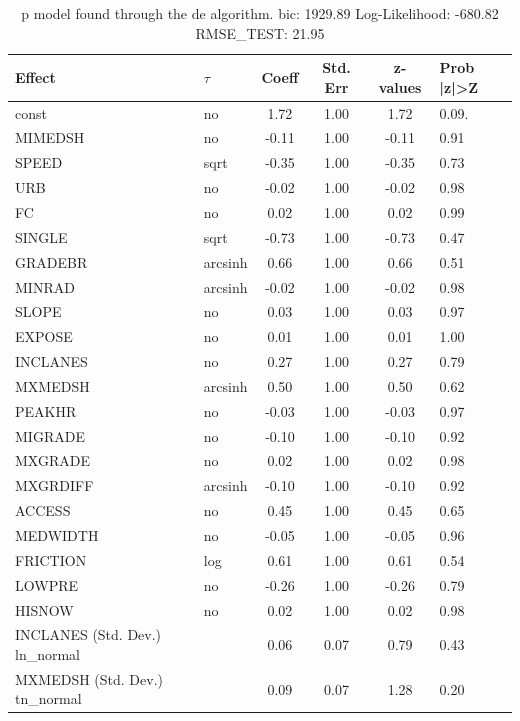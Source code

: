 \begin{table}
	\caption{p model found through the de algorithm. bic: 1929.89 Log-Likelihood: -680.82 RMSE_TEST: 21.95}
	\begin{center}
		\begin{tabular}{|l|l|c|c|c|l|}
			\hline
			Effect & $\tau$ & Coeff & Std. Err & z-values & Prob |z|>Z \\
			\hline
			const & no & 1.72 & 1.00 & 1.72 & 0.09. \\
			\hline
			MIMEDSH & no & -0.11 & 1.00 & -0.11 & 0.91 \\
			\hline
			SPEED & sqrt & -0.35 & 1.00 & -0.35 & 0.73 \\
			\hline
			URB & no & -0.02 & 1.00 & -0.02 & 0.98 \\
			\hline
			FC & no & 0.02 & 1.00 & 0.02 & 0.99 \\
			\hline
			SINGLE & sqrt & -0.73 & 1.00 & -0.73 & 0.47 \\
			\hline
			GRADEBR & arcsinh & 0.66 & 1.00 & 0.66 & 0.51 \\
			\hline
			MINRAD & arcsinh & -0.02 & 1.00 & -0.02 & 0.98 \\
			\hline
			SLOPE & no & 0.03 & 1.00 & 0.03 & 0.97 \\
			\hline
			EXPOSE & no & 0.01 & 1.00 & 0.01 & 1.00 \\
			\hline
			INCLANES & no & 0.27 & 1.00 & 0.27 & 0.79 \\
			\hline
			MXMEDSH & arcsinh & 0.50 & 1.00 & 0.50 & 0.62 \\
			\hline
			PEAKHR & no & -0.03 & 1.00 & -0.03 & 0.97 \\
			\hline
			MIGRADE & no & -0.10 & 1.00 & -0.10 & 0.92 \\
			\hline
			MXGRADE & no & 0.02 & 1.00 & 0.02 & 0.98 \\
			\hline
			MXGRDIFF & arcsinh & -0.10 & 1.00 & -0.10 & 0.92 \\
			\hline
			ACCESS & no & 0.45 & 1.00 & 0.45 & 0.65 \\
			\hline
			MEDWIDTH & no & -0.05 & 1.00 & -0.05 & 0.96 \\
			\hline
			FRICTION & log & 0.61 & 1.00 & 0.61 & 0.54 \\
			\hline
			LOWPRE & no & -0.26 & 1.00 & -0.26 & 0.79 \\
			\hline
			HISNOW & no & 0.02 & 1.00 & 0.02 & 0.98 \\
			\hline
			INCLANES (Std. Dev.) ln_normal &  & 0.06 & 0.07 & 0.79 & 0.43 \\
			\hline
			MXMEDSH (Std. Dev.) tn_normal &  & 0.09 & 0.07 & 1.28 & 0.20 \\

\end{tabular}
\end{center}
\end{table}
